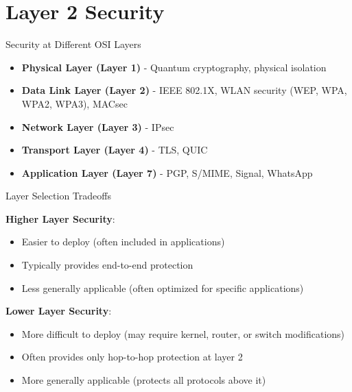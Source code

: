 \section{Layer 2 Security}


\begin{minipage}{0.4\linewidth}

\begin{concept}{Security at Different OSI Layers}
\begin{itemize}
    \item \textbf{Physical Layer (Layer 1)} - Quantum cryptography, physical isolation
    \item \textbf{Data Link Layer (Layer 2)} - IEEE 802.1X, WLAN security (WEP, WPA, WPA2, WPA3), MACsec
    \item \textbf{Network Layer (Layer 3)} - IPsec
    \item \textbf{Transport Layer (Layer 4)} - TLS, QUIC
    \item \textbf{Application Layer (Layer 7)} - PGP, S/MIME, Signal, WhatsApp
\end{itemize}
\end{concept}
\end{minipage}
\begin{minipage}{0.6\linewidth}

\begin{theorem}{Layer Selection Tradeoffs}

    \textbf{Higher Layer Security}:
    \begin{itemize}
        \item Easier to deploy (often included in applications)
        \item Typically provides end-to-end protection
        \item Less generally applicable (often optimized for specific applications)
    \end{itemize}

    \textbf{Lower Layer Security}:
    \begin{itemize}
        \item More difficult to deploy (may require kernel, router, or switch modifications)
        \item Often provides only hop-to-hop protection at layer 2
        \item More generally applicable (protects all protocols above it)
    \end{itemize}

\end{theorem}
\end{minipage}

